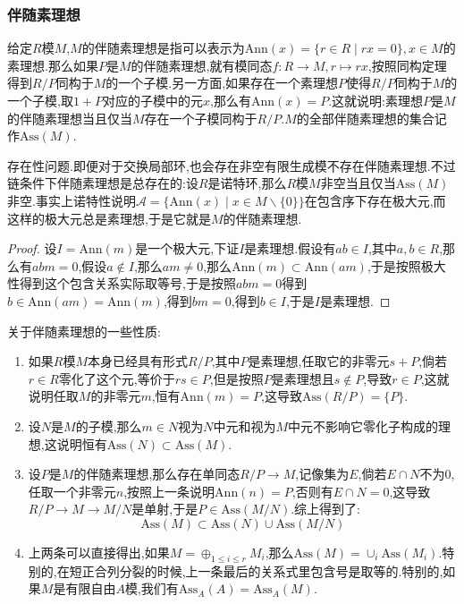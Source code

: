 \subsubsection{伴随素理想}

给定$R$模$M$,$M$的伴随素理想是指可以表示为$\mathrm{Ann}(x)=\{r\in R\mid rx=0\},x\in M$的素理想.那么如果$P$是$M$的伴随素理想,就有模同态$f:R\to M,r\mapsto rx$,按照同构定理得到$R/P$同构于$M$的一个子模.另一方面,如果存在一个素理想$P$使得$R/P$同构于$M$的一个子模,取$1+P$对应的子模中的元$x$,那么有$\mathrm{Ann}(x)=P$.这就说明:素理想$P$是$M$的伴随素理想当且仅当$M$存在一个子模同构于$R/P$.$M$的全部伴随素理想的集合记作$\mathrm{Ass}(M)$.

存在性问题.即便对于交换局部环,也会存在非空有限生成模不存在伴随素理想.不过链条件下伴随素理想是总存在的:设$R$是诺特环,那么$R$模$M$非空当且仅当$\mathrm{Ass}(M)$非空.事实上诺特性说明$\mathscr{A}=\{\mathrm{Ann}(x)\mid x\in M\backslash\{0\}\}$在包含序下存在极大元,而这样的极大元总是素理想,于是它就是$M$的伴随素理想.
\begin{proof}
	
	设$I=\mathrm{Ann}(m)$是一个极大元,下证$I$是素理想.假设有$ab\in I$,其中$a,b\in R$,那么有$abm=0$,假设$a\not\in I$,那么$am\not=0$,那么$\mathrm{Ann}(m)\subset\mathrm{Ann}(am)$,于是按照极大性得到这个包含关系实际取等号,于是按照$abm=0$得到$b\in\mathrm{Ann}(am)=\mathrm{Ann}(m)$,得到$bm=0$,得到$b\in I$,于是$I$是素理想.
\end{proof}

关于伴随素理想的一些性质:
\begin{enumerate}
	\item 如果$R$模$M$本身已经具有形式$R/P$,其中$P$是素理想,任取它的非零元$s+P$,倘若$r\in R$零化了这个元,等价于$rs\in P$,但是按照$P$是素理想且$s\not\in P$,导致$r\in P$,这就说明任取$M$的非零元$m$,恒有$\mathrm{Ann}(m)=P$,这导致$\mathrm{Ass}(R/P)=\{P\}$.
	\item 设$N$是$M$的子模,那么$m\in N$视为$N$中元和视为$M$中元不影响它零化子构成的理想,这说明恒有$\mathrm{Ass}(N)\subset\mathrm{Ass}(M)$.
	\item 设$P$是$M$的伴随素理想,那么存在单同态$R/P\to M$,记像集为$E$,倘若$E\cap N$不为0,任取一个非零元$n$,按照上一条说明$\mathrm{Ann}(n)=P$,否则有$E\cap N=0$,这导致$R/P\to M\to M/N$是单射,于是$P\in\mathrm{Ass}(M/N)$.综上得到了:
	$$\mathrm{Ass}(M)\subset\mathrm{Ass}(N)\cup\mathrm{Ass}(M/N)$$
	\item 上两条可以直接得出,如果$M=\oplus_{1\le i\le r}M_i$,那么$\mathrm{Ass}(M)=\cup_i\mathrm{Ass}(M_i)$.特别的,在短正合列分裂的时候,上一条最后的关系式里包含号是取等的.特别的,如果$M$是有限自由$A$模,我们有$\mathrm{Ass}_A(A)=\mathrm{Ass}_A(M)$.
\end{enumerate}

